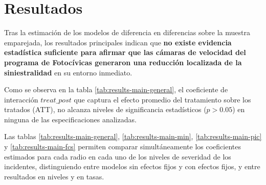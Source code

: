 \section{Resultados}
\noindent Tras la estimación de los modelos de diferencia en diferencias sobre la muestra emparejada, los resultados principales indican que \textbf{no existe evidencia estadística suficiente para afirmar que las cámaras de velocidad del programa de Fotocívicas generaron una reducción localizada de la siniestralidad} en su entorno inmediato.  

Como se observa en la tabla \ref{tab:results-main-general}, el coeficiente de interacción $treat\_post$ que captura el efecto promedio del tratamiento sobre los tratados (ATT), no alcanza niveles de significancia estadísticos ($p > 0.05$) en ninguna de las especificaciones analizadas. 

Las tablas \ref{tab:results-main-general}, \ref{tab:results-main-min}, \ref{tab:results-main-pic} y \ref{tab:results-main-fcs} permiten comparar simultáneamente los coeficientes estimados para cada radio en cada uno de los niveles de severidad de los incidentes, distinguiendo entre modelos sin efectos fijos y con efectos fijos, y entre resultados en niveles y en tasas.

